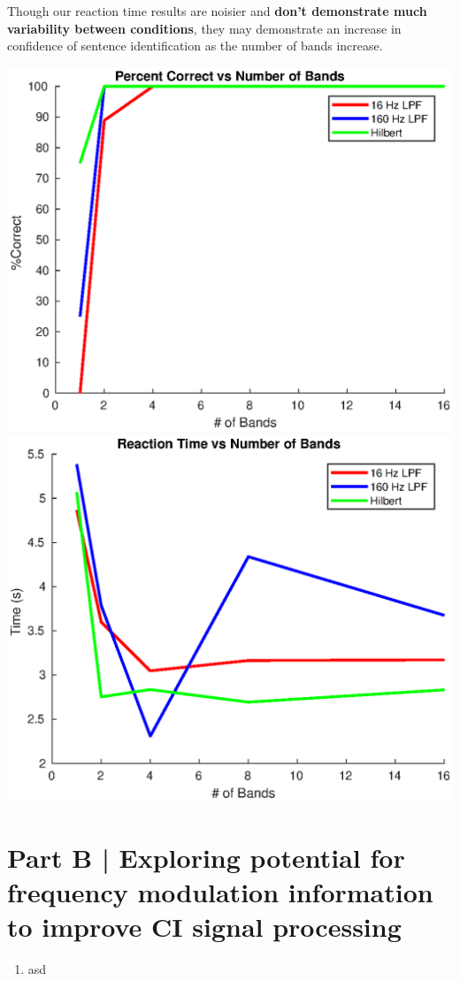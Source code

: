 \documentclass[9pt]{extarticle}
\begin{document}
\begin{enumerate}[label = \alph*) ]
Though our reaction time results are noisier and \textbf{don't demonstrate much variability between conditions}, they may demonstrate an increase in confidence of sentence identification as the number of bands increase. 

\begin{center}
\includegraphics[width = .47\textwidth]{figA1}
\includegraphics[width = .47\textwidth]{figA2}
\end{center}

\end{enumerate}


\section{Part B | Exploring potential for frequency modulation information to improve CI signal processing}

\begin{enumerate}[label = \alph*)]

\item asd

\end{enumerate}
\end{document}
